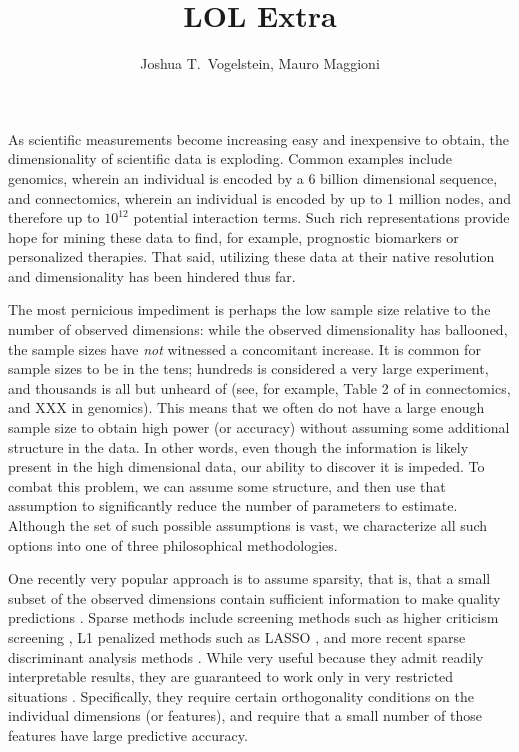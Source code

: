 \documentclass[10pt]{article}
\title{\vspace{-50pt}LOL Extra}
\author{Joshua T.~Vogelstein, Mauro Maggioni}
\date{}
\begin{document}
\maketitle


As scientific measurements become increasing easy and inexpensive to obtain, the dimensionality of scientific data is exploding.  Common examples include genomics, wherein an individual is encoded by a 6 billion dimensional sequence, and connectomics, wherein an individual is encoded by up to 1 million nodes, and therefore up to $10^{12}$ potential interaction terms.  Such rich representations provide hope for mining these data to find, for example, prognostic biomarkers or personalized therapies.  That said, utilizing these data at their native resolution and dimensionality has been hindered thus far.

The most pernicious impediment is perhaps the low sample size relative to the number of observed dimensions:  while the observed dimensionality has ballooned, the sample sizes have \emph{not} witnessed a concomitant increase.  It is common for sample sizes to be in the tens; hundreds is considered a very large experiment, and thousands is all but unheard of (see, for example, Table 2 of \cite{DiMartino2014} in connectomics, and XXX in genomics).   This means that we often do not have a large enough sample size to obtain high power (or accuracy) without assuming some additional structure in the data. 
In other words, even though the information is likely present in the high dimensional data, our ability to discover it is impeded. 
To combat this problem, we can assume some structure, and then use that assumption to significantly reduce the number of parameters to estimate.  
Although the set of such possible assumptions is vast, we characterize all such options into one of three philosophical methodologies.


One recently very popular approach is to assume sparsity, that is, that a small subset of the observed dimensions contain sufficient information to make quality predictions \cite{Olshausen97a, Buhlmann2014}.  Sparse methods include screening methods such as higher criticism screening \cite{Donoho08a}, L1 penalized methods such as LASSO \cite{Tibs96}, and more recent sparse discriminant analysis methods \cite{Clemmensen2011,Mai12a,Fan2012}. While very useful because they admit readily interpretable results, they are guaranteed to work only in very restricted situations \cite{Buhlmann2014}.  Specifically, they require certain orthogonality conditions on the individual dimensions (or features), and require that a small number of those features have large predictive accuracy.  
\end{document}

